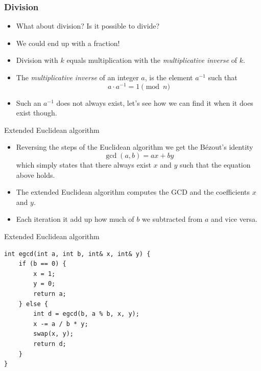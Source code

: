 \documentclass{beamer}
\begin{document}
\begin{frame}[plain]
  \frametitle{Division}
  \vspace{30pt}
  \begin{itemize}
    \item What about division? Is it possible to divide? 
    \item We could end up with a fraction!
    \item Division with $k$ equals multiplication with the \emph{multiplicative
      inverse} of $k$.
    \item The \emph{multiplicative inverse} of an integer $a$, is the element $a^{-1}$ such that
      \[
        a \cdot a^{-1} = 1 \pmod{n}
      \]
   \item<5-> Such an $a^{-1}$ does not always exist, let's see how we can find it when it does exist though.
  \end{itemize}
\end{frame}



\begin{frame}[plain]{Extended Euclidean algorithm}
  \vspace{20pt}
  \begin{itemize}
    \item Reversing the steps of the Euclidean algorithm we get the B\'ezout's identity
      \[
        \gcd(a, b) = ax + by
      \]
    which simply states that there always exist $x$ and $y$ such that the equation above holds.
    \item The extended Euclidean algorithm computes the GCD and the coefficients $x$ and $y$.
    \item Each iteration it add up how much of $b$ we subtracted from $a$ and vice versa.
  \end{itemize}
\end{frame}

\begin{frame}{Extended Euclidean algorithm}
  \vspace{10pt}
    \begin{verbatim}
int egcd(int a, int b, int& x, int& y) {
    if (b == 0) {
        x = 1;
        y = 0;
        return a;
    } else {
        int d = egcd(b, a % b, x, y);
        x -= a / b * y;
        swap(x, y);
        return d;
    }
}
    \end{verbatim}
\end{frame}
\end{document}
